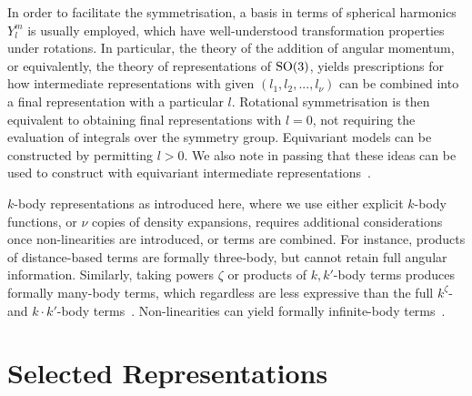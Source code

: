 
In order to facilitate the symmetrisation, a basis in terms of spherical harmonics $Y_l^m$ is usually employed, which have well-understood transformation properties under rotations. In particular, the theory of the addition of angular momentum, or equivalently, the theory of representations of $\text{SO}(3)$, yields prescriptions for how intermediate representations with given $(l_1, l_2, ..., l_\nu)$ can be combined into a final representation with a particular $l$. 
Rotational symmetrisation is then equivalent to obtaining final representations with $l=0$, not requiring the evaluation of integrals over the symmetry group. Equivariant models can be constructed by permitting $l>0$.
We also note in passing that these ideas can be used to construct \nns with equivariant intermediate representations~\cite{s2021q,bmsk2022q,sug2021q}.

 $k$-body representations as introduced here, where we use either explicit $k$-body functions, or $\nu$ copies of density expansions, requires additional considerations once non-linearities are introduced, or terms are combined. For instance, products of distance-based terms are formally three-body, but cannot retain full angular information. Similarly, taking powers $\zeta$ or products of $k,k'$-body terms produces formally many-body terms, which regardless are less expressive than the full $k^\zeta$- and $k\cdot k'$-body terms~\cite{jkak2020q}. Non-linearities can yield formally infinite-body terms~\cite{npfc2022q}.

\section{Selected Representations}
\label{sec:repr-selected}

